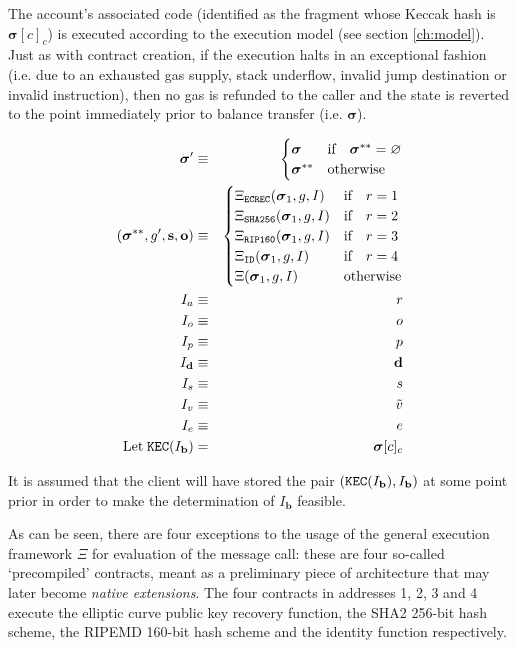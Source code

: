 \documentclass[9pt,oneside]{amsart}
\begin{document}
\begin{multicols}{2}
The account's associated code (identified as the fragment whose Keccak hash is $\boldsymbol{\sigma}[c]_c$) is executed according to the execution model (see section \ref{ch:model}). Just as with contract creation, if the execution halts in an exceptional fashion (i.e. due to an exhausted gas supply, stack underflow, invalid jump destination or invalid instruction), then no gas is refunded to the caller and the state is reverted to the point immediately prior to balance transfer (i.e. $\boldsymbol{\sigma}$).

\begin{eqnarray}
\boldsymbol{\sigma}' & \equiv & \begin{cases}
\boldsymbol{\sigma} & \text{if} \quad \boldsymbol{\sigma}^{**} = \varnothing \\
\boldsymbol{\sigma}^{**} & \text{otherwise}
\end{cases} \\
(\boldsymbol{\sigma}^{**}, g', \mathbf{s}, \mathbf{o}) & \equiv & \begin{cases}
\Xi_{\mathtt{ECREC}}(\boldsymbol{\sigma}_1, g, I) & \text{if} \quad r = 1 \\
\Xi_{\mathtt{SHA256}}(\boldsymbol{\sigma}_1, g, I) & \text{if} \quad r = 2 \\
\Xi_{\mathtt{RIP160}}(\boldsymbol{\sigma}_1, g, I) & \text{if} \quad r = 3 \\
\Xi_{\mathtt{ID}}(\boldsymbol{\sigma}_1, g, I) & \text{if} \quad r = 4 \\
\Xi(\boldsymbol{\sigma}_1, g, I) & \text{otherwise} \end{cases} \\
I_a & \equiv & r \\
I_o & \equiv & o \\
I_p & \equiv & p \\
I_\mathbf{d} & \equiv & \mathbf{d} \\
I_s & \equiv & s \\
I_v & \equiv & \tilde{v} \\
I_e & \equiv & e \\
\text{Let} \; \mathtt{\tiny KEC}(I_\mathbf{b}) & = & \boldsymbol{\sigma}[c]_c
\end{eqnarray}

It is assumed that the client will have stored the pair $(\mathtt{\tiny KEC}(I_\mathbf{b}), I_\mathbf{b})$ at some point prior in order to make the determination of $I_\mathbf{b}$ feasible.

As can be seen, there are four exceptions to the usage of the general execution framework $\Xi$ for evaluation of the message call: these are four so-called `precompiled' contracts, meant as a preliminary piece of architecture that may later become \textit{native extensions}. The four contracts in addresses 1, 2, 3 and 4 execute the elliptic curve public key recovery function, the SHA2 256-bit hash scheme, the RIPEMD 160-bit hash scheme and the identity function respectively.


\end{multicols}
\end{document}
